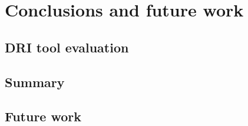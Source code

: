 \chapter{Conclusions and future work}
\label{cha:conclusions}
	\section{DRI tool evaluation}
	\section{Summary}
	\section{Future work}
